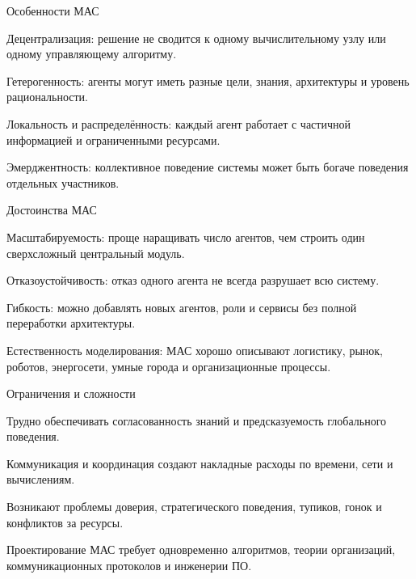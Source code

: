 \begin{frame}{Особенности МАС}
	\topline
	\justifying
	\begin{textitemize}
		\item Децентрализация: решение не сводится к одному вычислительному узлу или одному управляющему алгоритму.
		\item Гетерогенность: агенты могут иметь разные цели, знания, архитектуры и уровень рациональности.
		\item Локальность и распределённость: каждый агент работает с частичной информацией и ограниченными ресурсами.
		\item Эмерджентность: коллективное поведение системы может быть богаче поведения отдельных участников.
	\end{textitemize}
\end{frame}

\begin{frame}{Достоинства МАС}
	\topline
	\justifying
	\begin{textitemize}
		\item Масштабируемость: проще наращивать число агентов, чем строить один сверхсложный центральный модуль.
		\item Отказоустойчивость: отказ одного агента не всегда разрушает всю систему.
		\item Гибкость: можно добавлять новых агентов, роли и сервисы без полной переработки архитектуры.
		\item Естественность моделирования: МАС хорошо описывают логистику, рынок, роботов, энергосети, умные города и организационные процессы.
	\end{textitemize}
\end{frame}

\begin{frame}{Ограничения и сложности}
	\topline
	\justifying
	\begin{textitemize}
		\item Трудно обеспечивать согласованность знаний и предсказуемость глобального поведения.
		\item Коммуникация и координация создают накладные расходы по времени, сети и вычислениям.
		\item Возникают проблемы доверия, стратегического поведения, тупиков, гонок и конфликтов за ресурсы.
		\item Проектирование МАС требует одновременно алгоритмов, теории организаций, коммуникационных протоколов и инженерии ПО.
	\end{textitemize}
\end{frame}

